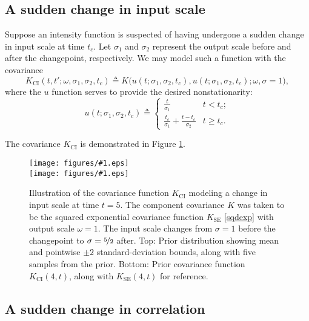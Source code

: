 \documentclass{article}
\newcommand{\deq}{\triangleq}
\newcommand{\psff}[1]{\texttt{[image: figures/\#1.eps]}}
\begin{document}
\subsection{A sudden change in input scale}

Suppose an intensity function is suspected of having undergone a
sudden change in input scale at time $t_c$.  Let $\sigma_1$ and
$\sigma_2$ represent the output scale before and after the changepoint,
respectively.  We may model such a function with the covariance
\begin{equation*}
  K_{\text{CI}}(t, t'; \omega, \sigma_1, \sigma_2, t_c)
  \deq 
  K
  \bigl(
    u(t; \sigma_1, \sigma_2, t_c), 
    u(t; \sigma_1, \sigma_2, t_c); 
    \omega, \sigma = 1 
  \bigr),
\end{equation*}
where the $u$ function serves to provide the desired nonstationarity:
\begin{equation}
  \label{inchange}
  u(t; \sigma_1, \sigma_2, t_c) 
  \deq
  \begin{cases}
    \frac{t}{\sigma_1} 
    & t < t_c; \\
    \frac{t_c}{\sigma_1} + \frac{t - t_c}{\sigma_2} 
    & t \geq t_c.
  \end{cases}
\end{equation}

The covariance $K_{\text{CI}}$ is demonstrated in Figure
\ref{fig:changeinput}.

\begin{figure}
  \centering
  \psff{changepointcovsamples2} \\
  \bigskip
  \psff{changepointcov2}\medskip
  \caption{Illustration of the covariance function $K_{\text{CI}}$
    modeling a change in input scale at time $t = \text{5}$.  The
    component covariance $K$ was taken to be the squared exponential
    covariance function $K_{\text{SE}}$ \eqref{sqdexp} with output
    scale $\omega = 1$.  The input scale changes from $\sigma = 1$
    before the changepoint to $\sigma = \nicefrac{5}{2}$ after. Top:
    Prior distribution showing mean and pointwise $\pm 2$
    standard-deviation bounds, along with five samples from the prior.
    Bottom: Prior covariance function $K_{\text{CI}}(4, t)$, along
    with $K_{\text{SE}}(4, t)$ for reference.  }
  \label{fig:changeinput}
\end{figure}

\subsection{A sudden change in correlation}
\end{document}
